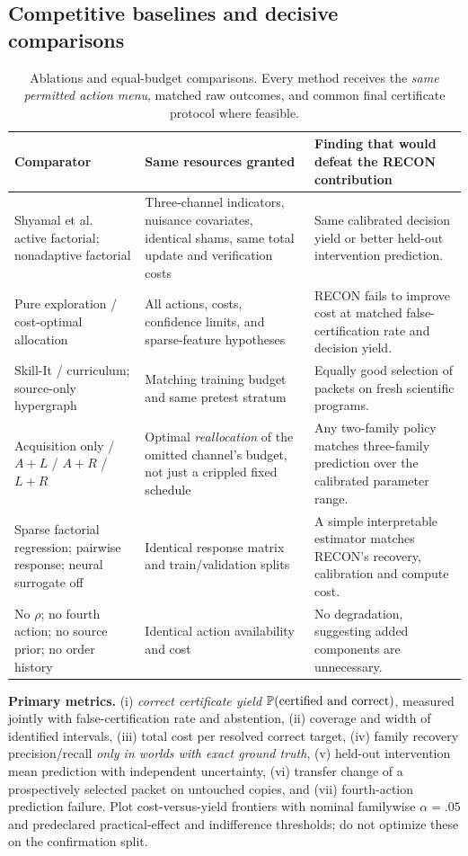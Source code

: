 \documentclass[11pt,a4paper]{article}
\theoremstyle{definition}\newtheorem{definition}[theorem]{Definition}
\theoremstyle{remark}\newtheorem{remark}[theorem]{Remark}
\begin{document}
\subsection{Competitive baselines and decisive comparisons}
\begin{table}[htbp]\centering\footnotesize
\caption{Ablations and equal-budget comparisons. Every method receives the \emph{same permitted action menu}, matched raw outcomes, and common final certificate protocol where feasible.}\label{tab:baseline}
\begin{tabularx}{\linewidth}{@{}p{.24\linewidth}Y Y@{}}\toprule
Comparator&Same resources granted&Finding that would defeat the RECON contribution\\\midrule
Shyamal et al.\ \citep{shyamal} active factorial; nonadaptive factorial&Three-channel indicators, nuisance covariates, identical shams, same total update and verification costs&Same calibrated decision yield or better held-out intervention prediction.\\
Pure exploration / cost-optimal allocation \citep{garivier,degenne}&All actions, costs, confidence limits, and sparse-feature hypotheses&RECON fails to improve cost at matched false-certification rate and decision yield.\\
Skill-It / curriculum; source-only hypergraph \citep{skillit,curriculum}&Matching training budget and same pretest stratum&Equally good selection of packets on fresh scientific programs.\\
Acquisition only / $A+L$ / $A+R$ / $L+R$&Optimal \emph{reallocation} of the omitted channel's budget, not just a crippled fixed schedule&Any two-family policy matches three-family prediction over the calibrated parameter range.\\
Sparse factorial regression; pairwise response; neural surrogate off&Identical response matrix and train/validation splits&A simple interpretable estimator matches RECON's recovery, calibration and compute cost.\\
No $\rho$; no fourth action; no source prior; no order history&Identical action availability and cost&No degradation, suggesting added components are unnecessary.\\\bottomrule
\end{tabularx}
\end{table}

\textbf{Primary metrics.} (i) \emph{correct certificate yield} $\mathbb{P}(\text{certified and correct})$, measured jointly with false-certification rate and abstention, (ii) coverage and width of identified intervals, (iii) total cost per resolved correct target, (iv) family recovery precision/recall \emph{only in worlds with exact ground truth}, (v) held-out intervention mean prediction with independent uncertainty, (vi) transfer change of a prospectively selected packet on untouched copies, and (vii) fourth-action prediction failure. Plot cost-versus-yield frontiers with nominal familywise $\alpha=.05$ and predeclared practical-effect and indifference thresholds; do not optimize these on the confirmation split.
\end{document}
